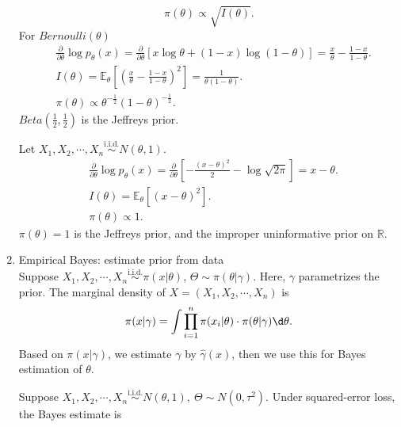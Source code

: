 \documentclass[a4paper]{article}
\begin{document}
\begin{answer}
\begin{enumerate}
		\begin{equation*}
			\pi(\theta) \propto \sqrt{I(\theta)}.
		\end{equation*}
		For $Bernoulli(\theta)$
		\begin{equation}
			\begin{aligned}
				& \frac{\partial}{\partial \theta} \log p_\theta(x) =  \frac{\partial}{\partial \theta}[x \log\theta + (1-x) \log (1-\theta)] = \frac{x}{\theta} - \frac{1-x}{1-\theta}. \\
				& I(\theta) = \mathbb{E}_\theta\left[\left(\frac{x}{\theta} - \frac{1-x}{1-\theta}\right)^2\right] = \frac{1}{\theta (1-\theta)}. \\
				& \pi(\theta) \propto \theta^{-\frac{1}{2}} (1-\theta)^{-\frac{1}{2}}.
			\end{aligned}
		\end{equation}
		$Beta\left(\frac{1}{2},\frac{1}{2}\right)$ is the Jeffreys prior.
		\begin{eg}
			Let $X_1, X_2, \cdots, X_n \stackrel{\text{i.i.d.}}{\sim} N(\theta,1)$.
			\begin{equation}
				\begin{aligned}
					& \frac{\partial}{\partial \theta} \log p_\theta(x) =  \frac{\partial}{\partial \theta}\left[-\frac{(x-\theta)^2}{2} - \log \sqrt{2\pi}\right] = x - \theta. \\
					& I(\theta) = \mathbb{E}_\theta\left[(x - \theta)^2\right]. \\
					& \pi(\theta) \propto 1.
				\end{aligned}
			\end{equation}
			$\pi(\theta) = 1$ is the Jeffreys prior, and the improper uninformative prior on $\mathbb{R}$.
		\end{eg}
		\item Empirical Bayes: estimate prior from data\\
		Suppose $X_1, X_2, \cdots, X_n \stackrel{\text{i.i.d.}}{\sim} \pi(x|\theta)$, $\Theta \sim \pi(\theta|\gamma)$. Here, $\gamma$ parametrizes the prior. The marginal density of $X = (X_1,X_2, \cdots, X_n)$ is
		\begin{equation*}
			\pi(x|\gamma) = \int \prod\limits_{i=1}^n \pi(x_i|\theta) \cdot \pi(\theta|\gamma) \d \theta.
		\end{equation*}
		Based on $\pi(x|\gamma)$, we estimate $\gamma$ by $\hat{\gamma}(x)$, then we use this for Bayes estimation of $\theta$.
		\begin{eg}
			Suppose $X_1, X_2, \cdots, X_n \stackrel{\text{i.i.d.}}{\sim} N(\theta,1), \ \Theta \sim N(0,\tau^2)$. Under squared-error loss, the Bayes estimate is

\end{eg}
\end{enumerate}
\end{answer}
\end{document}
